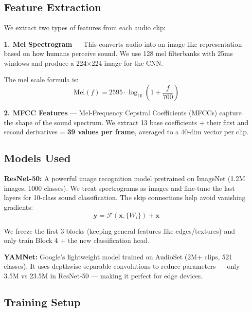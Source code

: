 \documentclass[11pt,a4paper]{article}
\begin{document}
\subsection{Feature Extraction}

We extract two types of features from each audio clip:

\textbf{1. Mel Spectrogram} — This converts audio into an image-like representation based on how humans perceive sound. We use 128 mel filterbanks with 25ms windows and produce a 224×224 image for the CNN.

The mel scale formula is:
\begin{equation}
\text{Mel}(f) = 2595 \cdot \log_{10}\!\left(1 + \frac{f}{700}\right)
\end{equation}

\textbf{2. MFCC Features} — Mel-Frequency Cepstral Coefficients (MFCCs) capture the shape of the sound spectrum. We extract 13 base coefficients + their first and second derivatives = \textbf{39 values per frame}, averaged to a 40-dim vector per clip.

\subsection{Models Used}

\textbf{ResNet-50:} A powerful image recognition model pretrained on ImageNet (1.2M images, 1000 classes). We treat spectrograms as images and fine-tune the last layers for 10-class sound classification. The skip connections help avoid vanishing gradients:
\begin{equation}
\mathbf{y} = \mathcal{F}(\mathbf{x}, \{W_i\}) + \mathbf{x}
\end{equation}

We freeze the first 3 blocks (keeping general features like edges/textures) and only train Block 4 + the new classification head.

\textbf{YAMNet:} Google's lightweight model trained on AudioSet (2M+ clips, 521 classes). It uses depthwise separable convolutions to reduce parameters — only 3.5M vs 23.5M in ResNet-50 — making it perfect for edge devices.

\subsection{Training Setup}
\end{document}

